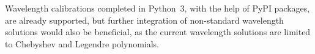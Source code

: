 Wavelength calibrations completed in Python~$3$, with the help of \gls{PyPI} packages, are already supported, but further integration of non-standard wavelength solutions would also be beneficial, as the current wavelength solutions are limited to Chebyshev and Legendre polynomials.
